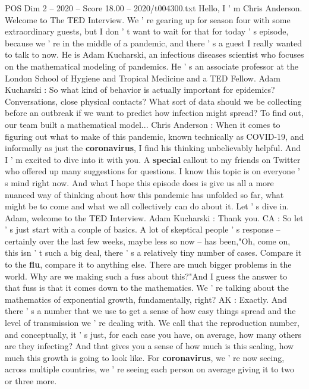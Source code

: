 \begin{textsample}{POS Dim 2 – 2020 – Score 18.00 – 2020/t004300.txt}  \label{ex:f2_pos_012}
Hello, I ' m Chris Anderson.
Welcome to The TED Interview.
We ' re gearing up for season four with some extraordinary guests, but I don ' t want to wait for that for today ' s episode, because we ' re in the middle of a pandemic, and there ' s a guest I really wanted to talk to now.
He is Adam Kucharski, an infectious diseases scientist who focuses on the mathematical modeling of pandemics.
He ' s an associate professor at the London School of Hygiene and Tropical Medicine and a TED Fellow.
Adam Kucharski : So what kind of behavior is actually important for epidemics?
Conversations, close physical contacts?
What sort of data should we be collecting before an outbreak if we want to predict how infection might spread?
To find out, our team built a mathematical model...
Chris Anderson : When it comes to figuring out what to make of this pandemic, known technically as COVID-19, and informally as just the \textbf{coronavirus}, I find his thinking unbelievably helpful.
And I ' m excited to dive into it with you.
A \textbf{special} callout to my friends on Twitter who offered up many suggestions for questions.
I know this topic is on everyone ' s mind right now.
And what I hope this episode does is give us all a more nuanced way of thinking about how this pandemic has unfolded so far, what might be to come and what we all collectively can do about it.
Let ' s dive in.
Adam, welcome to the TED Interview.
Adam Kucharski : Thank you.
CA : So let ' s just start with a couple of basics.
A lot of skeptical people ' s response -- certainly over the last few weeks, maybe less so now -- has been,"Oh, come on, this isn ' t such a big deal, there ' s a relatively tiny number of cases.
Compare it to the \textbf{flu}, compare it to anything else.
There are much bigger problems in the world.
Why are we making such a fuss about this?"And I guess the answer to that fuss is that it comes down to the mathematics.
We ' re talking about the mathematics of exponential growth, fundamentally, right?
AK : Exactly.
And there ' s a number that we use to get a sense of how easy things spread and the level of transmission we ' re dealing with.
We call that the reproduction number, and conceptually, it ' s just, for each case you have, on average, how many others are they infecting?
And that gives you a sense of how much is this scaling, how much this growth is going to look like.
For \textbf{coronavirus}, we ' re now seeing, across multiple countries, we ' re seeing each person on average giving it to two or three more.

\end{textsample}
